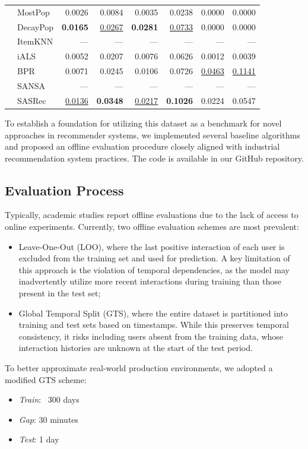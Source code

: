 \documentclass[sigconf,authorversion,nonacm]{acmart}
\begin{document}
\begin{table}
\begin{tabular}{llrrrrrr}
    & MostPop & 0.0026 & 0.0084 & 0.0035 & 0.0238 & 0.0000 & 0.0000 \\
    & DecayPop & \textbf{0.0165} & \underline{0.0267} & \textbf{0.0281} & \underline{0.0733} & 0.0000 & 0.0000 \\
    & ItemKNN & --- & --- & --- & --- & --- & --- \\
    & iALS & 0.0052 & 0.0207 & 0.0076 & 0.0626 & 0.0012 & 0.0039 \\
    & BPR & 0.0071 & 0.0245 & 0.0106 & 0.0726 & \underline{0.0463} & \underline{0.1141} \\
    & SANSA & --- & --- & --- & --- & --- & --- \\
    & SASRec & \underline{0.0136} & \textbf{0.0348} & \underline{0.0217} & \textbf{0.1026} & 0.0224 & 0.0547 \\
    \bottomrule
  \end{tabular}
\end{table}

To establish a foundation for utilizing this dataset as a benchmark for novel approaches in recommender systems, we implemented several baseline algorithms and proposed an offline evaluation procedure closely aligned with industrial recommendation system practices. The code is available in our GitHub repository.

\subsection{Evaluation Process}
Typically, academic studies report offline evaluations due to the lack of access to online experiments. Currently, two offline evaluation schemes are most prevalent:
\begin{itemize}
  \item Leave-One-Out (LOO), where the last positive interaction of each user is excluded from the training set and used for prediction. A key limitation of this approach is the violation of temporal dependencies, as the model may inadvertently utilize more recent interactions during training than those present in the test set;
  \item Global Temporal Split (GTS), where the entire dataset is partitioned into training and test sets based on timestamps. While this preserves temporal consistency, it risks including users absent from the training data, whose interaction histories are unknown at the start of the test period.
\end{itemize}

To better approximate real-world production environments, we adopted a modified GTS scheme:
\begin{itemize}
  \item \textit{Train}: ~300 days
  \item \textit{Gap}: 30 minutes
  \item \textit{Test}: 1 day
\end{itemize}
\end{document}
